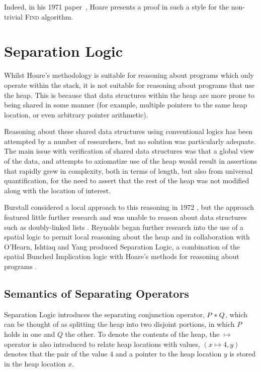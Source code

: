 \documentclass[a4paper,notitlepage]{report}
\begin{document}
  Indeed, in his 1971 paper~\cite{Hoare1971proof}, Hoare presents a proof in
  such a style for the non-trivial \textsc{Find} algorithm.


\section{Separation Logic}

  Whilst Hoare's methodology is suitable for reasoning about programs which only
  operate within the stack, it is not suitable for reasoning about programs that
  use the heap. This is because that data structures within the heap are more
  prone to being shared in some manner (for example, multiple pointers to the
  same heap location, or even arbitrary pointer arithmetic).

  Reasoning about these shared data structures using conventional logics has been attempted by a number of
  researchers, but no solution was particularly adequate. The main issue with
  verification of shared data structures was that a global view of the data, and
  attempts to axiomatize use of the heap would result in assertions
  that rapidly grew in complexity, both in terms of length, but also from
  universal quantification, for the need to assert that the rest of the heap was
  not modified along with the location of interest.

  Burstall considered a local approach to this reasoning in 1972
  \cite{burstall1972some}, but the approach featured little further research and
  was unable to reason about data structures such as doubly-linked lists
  \cite{reynolds2000intuitionistic}. Reynolds began further research into the
  use of a spatial logic to permit local reasoning about the heap and in
  collaboration with O'Hearn, Ishtiaq and Yang produced Separation Logic, a
  combination of the spatial Bunched Implication logic with Hoare's methods for
  reasoning about programs
  \cite{Ishtiaq2001BI,OHearn2001Local,Reynolds2002Separation}.

  \subsection{Semantics of Separating Operators}

  Separation Logic introduces the separating conjunction operator, $P \mathbin{*} Q$,
  which can be thought of as splitting the heap into two disjoint portions, in
  which $P$ holds in one and $Q$ the other. To denote the contents of the
  heap, the $\mapsto$ operator is also introduced to relate heap locations with
  values, $(x \mapsto 4, y)$ denotes that the pair of the value $4$ and a pointer
  to the heap location $y$ is stored in the heap location $x$.
\end{document}
